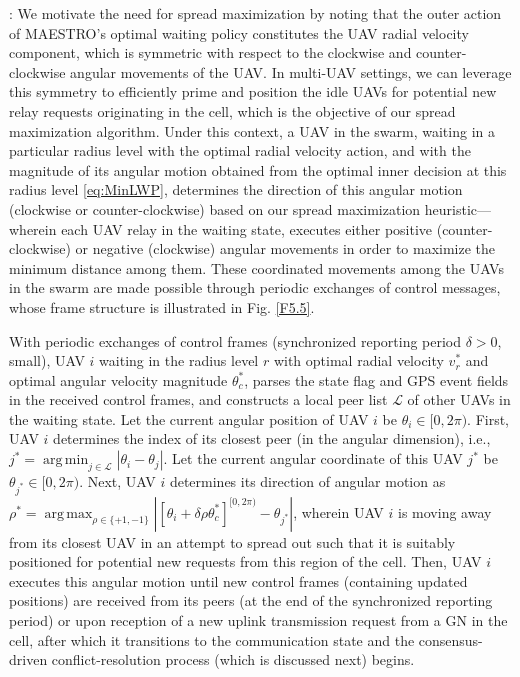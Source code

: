 \documentclass[12pt, draftcls, onecolumn]{IEEEtran}
\theoremstyle{plain}
\theoremstyle{definition}
\theoremstyle{remark}
\DeclareMathOperator*{\argmax}{arg\,max}
\DeclareMathOperator*{\argmin}{arg\,min}
\begin{document}
:
We motivate the need for spread maximization by noting that the outer action of MAESTRO's optimal waiting policy constitutes the UAV radial velocity component, which is symmetric with respect to the clockwise and counter-clockwise angular movements of the UAV. In multi-UAV settings, we can leverage this symmetry to efficiently prime and position the idle UAVs for potential new relay requests originating in the cell, which is the objective of our spread maximization algorithm. Under this context, a UAV in the swarm, waiting in a particular radius level with the optimal radial velocity action, and with the magnitude of its angular motion obtained from the optimal inner decision at this radius level \eqref{eq:MinLWP}, determines the direction of this angular motion (clockwise or counter-clockwise) based on our spread maximization heuristic---wherein each UAV relay in the {waiting} state, executes either positive (counter-clockwise) or negative (clockwise) angular movements in order to maximize the minimum distance among them. These coordinated movements among the UAVs in the swarm are made possible through periodic exchanges of control messages, whose frame structure is illustrated in Fig. \ref{F5.5}. 

With periodic exchanges of control frames (synchronized reporting period $\delta{>}0$, small), UAV $i$ waiting in the radius level $r$ with optimal radial velocity $v_{r}^{*}$ and optimal angular velocity magnitude $\theta_{c}^{*}$, parses the state flag and GPS event fields in the received control frames, and constructs a local peer list $\mathcal{L}$ of other UAVs in the waiting state. Let the current angular position of UAV $i$ be $\theta_{i}{\in}[0, 2\pi)$. First, UAV $i$ determines the index of its closest peer (in the angular dimension), i.e., $j^{*}{=}\argmin_{j{\in}\mathcal{L}}|\theta_{i}{-}\theta_{j}|$. Let the current angular coordinate of this UAV $j^{*}$ be $\theta_{j^{*}}{\in}[0,2\pi)$. Next, UAV $i$ determines its direction of angular motion as $\rho^{*}{=}\argmax_{\rho{\in}\{{+}1,{-}1\}} \left|[\theta_{i}{+}\delta\rho\theta_{c}^{*}]^{[0,2\pi)}{-}\theta_{j^{*}}\right|$, wherein UAV $i$ is moving away from its closest UAV in an attempt to spread out such that it is suitably positioned for potential new requests from this region of the cell. Then, UAV $i$ executes this angular motion until new control frames (containing updated positions) are received from its peers (at the end of the synchronized reporting period) or upon reception of a new uplink transmission request from a GN in the cell, after which it transitions to the communication state and the consensus-driven conflict-resolution process (which is discussed next) begins.
\end{document}
